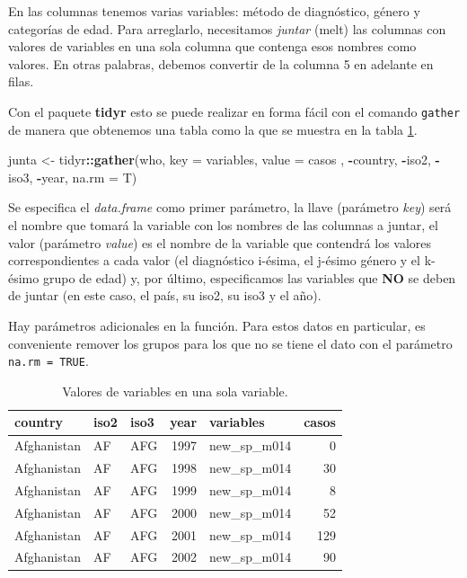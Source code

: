 \documentclass[]{article}
\newenvironment{Shaded}{\begin{snugshade}}{\end{snugshade}}
\newcommand{\KeywordTok}[1]{\textcolor[rgb]{0.13,0.29,0.53}{\textbf{#1}}}
\newcommand{\DataTypeTok}[1]{\textcolor[rgb]{0.13,0.29,0.53}{#1}}
\newcommand{\StringTok}[1]{\textcolor[rgb]{0.31,0.60,0.02}{#1}}
\newcommand{\OperatorTok}[1]{\textcolor[rgb]{0.81,0.36,0.00}{\textbf{#1}}}
\newcommand{\NormalTok}[1]{#1}
\begin{document}
En las columnas tenemos varias variables: método de diagnóstico, género
y categorías de edad. Para arreglarlo, necesitamos \emph{juntar} (melt)
las columnas con valores de variables en una sola columna que contenga
esos nombres como valores. En otras palabras, debemos convertir de la
columna 5 en adelante en filas.

Con el paquete \textbf{tidyr} esto se puede realizar en forma fácil con
el comando \texttt{gather} de manera que obtenemos una tabla como la que
se muestra en la tabla \ref{tab:varsjuntadas}.

\begin{Shaded}
\begin{Highlighting}[]
\NormalTok{junta <-}\StringTok{ }\NormalTok{tidyr}\OperatorTok{::}\KeywordTok{gather}\NormalTok{(who, }\DataTypeTok{key =}\NormalTok{ variables, }\DataTypeTok{value =}\NormalTok{ casos}
\NormalTok{                       , }\OperatorTok{-}\NormalTok{country, }\OperatorTok{-}\NormalTok{iso2, }\OperatorTok{-}\NormalTok{iso3, }\OperatorTok{-}\NormalTok{year, }\DataTypeTok{na.rm =}\NormalTok{ T)}
\end{Highlighting}
\end{Shaded}

Se especifica el \emph{data.frame} como primer parámetro, la llave
(parámetro \emph{key}) será el nombre que tomará la variable con los
nombres de las columnas a juntar, el valor (parámetro \emph{value}) es
el nombre de la variable que contendrá los valores correspondientes a
cada valor (el diagnóstico i-ésima, el j-ésimo género y el k-ésimo grupo
de edad) y, por último, especificamos las variables que \textbf{NO} se
deben de juntar (en este caso, el país, su iso2, su iso3 y el año).

Hay parámetros adicionales en la función. Para estos datos en
particular, es conveniente remover los grupos para los que no se tiene
el dato con el parámetro \texttt{na.rm\ =\ TRUE}.

\begin{table}[ht]
\centering
\begingroup\tiny
\begin{tabular}{lllrlr}
  \hline
country & iso2 & iso3 & year & variables & casos \\ 
  \hline
Afghanistan & AF & AFG & 1997 & new\_sp\_m014 &   0 \\ 
  Afghanistan & AF & AFG & 1998 & new\_sp\_m014 &  30 \\ 
  Afghanistan & AF & AFG & 1999 & new\_sp\_m014 &   8 \\ 
  Afghanistan & AF & AFG & 2000 & new\_sp\_m014 &  52 \\ 
  Afghanistan & AF & AFG & 2001 & new\_sp\_m014 & 129 \\ 
  Afghanistan & AF & AFG & 2002 & new\_sp\_m014 &  90 \\ 
   \hline
\end{tabular}
\endgroup
\caption{Valores de variables en una sola variable.} 
\label{tab:varsjuntadas}
\end{table}
\end{document}
